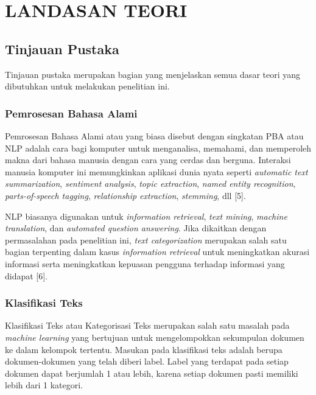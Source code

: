\chapter{LANDASAN TEORI}

%
\vspace{4.5pt}

\section{Tinjauan Pustaka}
\indent
Tinjauan pustaka merupakan bagian yang menjelaskan semua dasar teori yang dibutuhkan untuk melakukan penelitian ini.

\subsection{Pemrosesan Bahasa Alami}
\indent
Pemrosesan Bahasa Alami atau yang biasa disebut dengan singkatan PBA atau NLP adalah cara bagi komputer untuk menganalisa, memahami, dan memperoleh makna dari bahasa manusia dengan cara yang cerdas dan berguna. Interaksi manusia komputer ini memungkinkan aplikasi dunia nyata seperti {\itshape automatic text summarization}, {\itshape sentiment analysis}, {\itshape topic extraction}, {\itshape named entity recognition}, {\itshape parts-of-speech tagging}, {\itshape relationship extraction}, {\itshape stemming}, dll [5].

\indent 
NLP biasanya digunakan untuk {\itshape information retrieval}, {\itshape text mining}, {\itshape machine translation}, dan {\itshape automated question answering}. Jika dikaitkan dengan permasalahan pada penelitian ini, {\itshape text categorization} merupakan salah satu bagian terpenting dalam kasus {\itshape information retrieval} untuk meningkatkan akurasi informasi serta meningkatkan kepuasan pengguna terhadap informasi yang didapat [6].

\subsection{Klasifikasi Teks}
\indent
Klasifikasi Teks atau Kategorisasi Teks merupakan salah satu masalah pada {\itshape machine learning} yang bertujuan untuk mengelompokkan sekumpulan dokumen ke dalam kelompok tertentu. Masukan pada klasifikasi teks adalah berupa dokumen-dokumen yang telah diberi label. Label yang terdapat pada setiap dokumen dapat berjumlah 1 atau lebih, karena setiap dokumen pasti memiliki lebih dari 1 kategori.

